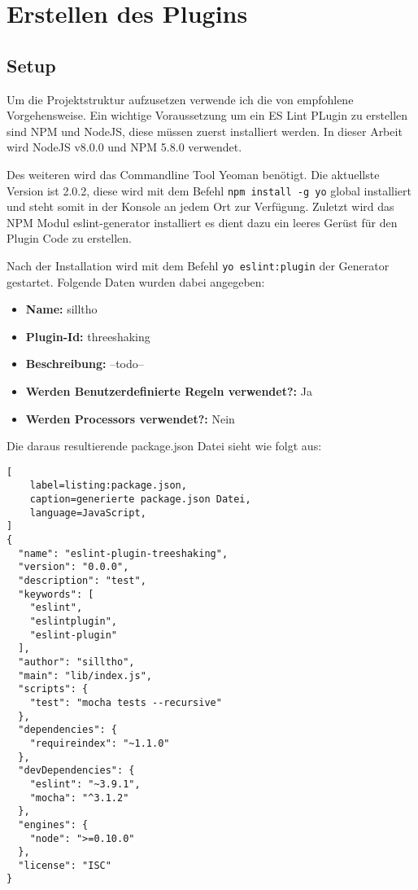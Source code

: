 \section{Erstellen des Plugins}
\subsection{Setup}
Um die Projektstruktur aufzusetzen verwende ich die von \textcite{ESLintNewRules} empfohlene Vorgehensweise. Ein wichtige Voraussetzung um ein ES Lint PLugin zu erstellen sind NPM und NodeJS, diese müssen zuerst installiert werden. In dieser Arbeit wird NodeJS v8.0.0 und NPM 5.8.0 verwendet.

Des weiteren wird das Commandline Tool Yeoman benötigt. Die aktuellste Version ist 2.0.2, diese wird mit dem Befehl \lstinline{npm install -g yo} global installiert und steht somit in der Konsole an jedem Ort zur Verfügung. Zuletzt wird das NPM Modul eslint-generator installiert es dient dazu ein leeres Gerüst für den Plugin Code zu erstellen.

Nach der Installation wird mit dem Befehl \lstinline{yo eslint:plugin} der Generator gestartet. Folgende Daten wurden dabei angegeben:
\begin{itemize}
	\item \textbf{Name:} silltho
    \item \textbf{Plugin-Id:} threeshaking
    \item \textbf{Beschreibung:} --todo--
    \item \textbf{Werden Benutzerdefinierte Regeln verwendet?:} Ja
    \item \textbf{Werden Processors verwendet?:} Nein
\end{itemize}

Die daraus resultierende package.json Datei sieht wie folgt aus:

\begin{lstlisting}[
    label=listing:package.json,
	caption=generierte package.json Datei,
	language=JavaScript,
]
{
  "name": "eslint-plugin-treeshaking",
  "version": "0.0.0",
  "description": "test",
  "keywords": [
    "eslint",
    "eslintplugin",
    "eslint-plugin"
  ],
  "author": "silltho",
  "main": "lib/index.js",
  "scripts": {
    "test": "mocha tests --recursive"
  },
  "dependencies": {
    "requireindex": "~1.1.0"
  },
  "devDependencies": {
    "eslint": "~3.9.1",
    "mocha": "^3.1.2"
  },
  "engines": {
    "node": ">=0.10.0"
  },
  "license": "ISC"
}
\end{lstlisting}


